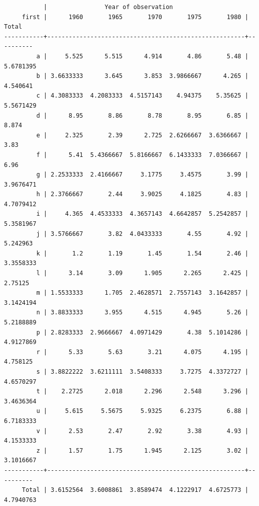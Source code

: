 \documentclass[
  12pt,
]{article}
\begin{document}
\begin{verbatim}
           |                Year of observation
     first |      1960       1965       1970       1975       1980 |     Total
-----------+-------------------------------------------------------+----------
         a |     5.525      5.515      4.914       4.86       5.48 | 5.6781395
         b | 3.6633333      3.645      3.853  3.9866667      4.265 |  4.540641
         c | 4.3083333  4.2083333  4.5157143    4.94375    5.35625 | 5.5671429
         d |      8.95       8.86       8.78       8.95       6.85 |     8.874
         e |     2.325       2.39      2.725  2.6266667  3.6366667 |      3.83
         f |      5.41  5.4366667  5.8166667  6.1433333  7.0366667 |      6.96
         g | 2.2533333  2.4166667     3.1775     3.4575       3.99 | 3.9676471
         h | 2.3766667       2.44     3.9025     4.1825       4.83 | 4.7079412
         i |     4.365  4.4533333  4.3657143  4.6642857  5.2542857 | 5.3581967
         j | 3.5766667       3.82  4.0433333       4.55       4.92 |  5.242963
         k |       1.2       1.19       1.45       1.54       2.46 | 3.3558333
         l |      3.14       3.09      1.905      2.265      2.425 |   2.75125
         m | 1.5533333      1.705  2.4628571  2.7557143  3.1642857 | 3.1424194
         n | 3.8833333      3.955      4.515      4.945       5.26 | 5.2188889
         p | 2.8283333  2.9666667  4.0971429       4.38  5.1014286 | 4.9127869
         r |      5.33       5.63       3.21      4.075      4.195 |  4.758125
         s | 3.8822222  3.6211111  3.5408333     3.7275  4.3372727 | 4.6570297
         t |    2.2725      2.018      2.296      2.548      3.296 | 3.4636364
         u |     5.615     5.5675     5.9325     6.2375       6.88 | 6.7183333
         v |      2.53       2.47       2.92       3.38       4.93 | 4.1533333
         z |      1.57       1.75      1.945      2.125       3.02 | 3.1016667
-----------+-------------------------------------------------------+----------
     Total | 3.6152564  3.6008861  3.8589474  4.1222917  4.6725773 | 4.7940763


\end{verbatim}
\end{document}
